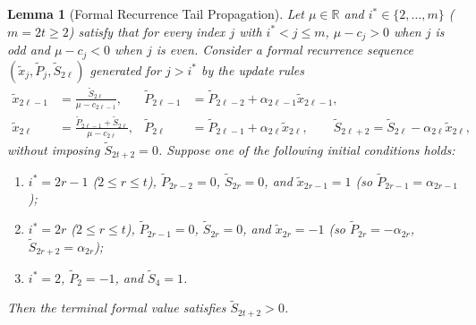 \documentclass[11pt,a4paper]{article}
\newtheorem{lemma}[theorem]{Lemma}
\theoremstyle{definition}
\begin{document}
\begin{lemma}[Formal Recurrence Tail Propagation]\label{lem:sign}
  Let $\mu \in \mathbb{R}$ and $i^* \in \{2,\dots,m\}$ ($m = 2t \ge 2$) satisfy that for every index $j$ with $i^* < j \le m$, $\mu - c_j > 0$ when $j$ is odd and $\mu - c_j < 0$ when $j$ is even. Consider a formal recurrence sequence $(\tilde{x}_j, \tilde{P}_j, \tilde{S}_{2\ell})$ generated for $j > i^*$ by the update rules
  \begin{align*}
    \tilde{x}_{2\ell-1} &= \frac{\tilde{S}_{2\ell}}{\mu - c_{2\ell-1}}, & \tilde{P}_{2\ell-1} &= \tilde{P}_{2\ell-2} + \alpha_{2\ell-1}\tilde{x}_{2\ell-1}, \\
    \tilde{x}_{2\ell} &= \frac{\tilde{P}_{2\ell-1} + \tilde{S}_{2\ell}}{\mu - c_{2\ell}}, & \tilde{P}_{2\ell} &= \tilde{P}_{2\ell-1} + \alpha_{2\ell}\tilde{x}_{2\ell}, \qquad \tilde{S}_{2\ell+2} = \tilde{S}_{2\ell} - \alpha_{2\ell}\tilde{x}_{2\ell},
  \end{align*}
  without imposing $\tilde{S}_{2t+2} = 0$. Suppose one of the following initial conditions holds:
  \begin{enumerate}
    \item[(a)] $i^* = 2r - 1$ ($2 \le r \le t$), $\tilde{P}_{2r-2} = 0$, $\tilde{S}_{2r} = 0$, and $\tilde{x}_{2r-1} = 1$ (so $\tilde{P}_{2r-1} = \alpha_{2r-1}$);
    \item[(b)] $i^* = 2r$ ($2 \le r \le t$), $\tilde{P}_{2r-1} = 0$, $\tilde{S}_{2r} = 0$, and $\tilde{x}_{2r} = -1$ (so $\tilde{P}_{2r} = -\alpha_{2r}$, $\tilde{S}_{2r+2} = \alpha_{2r}$);
    \item[(c)] $i^* = 2$, $\tilde{P}_2 = -1$, and $\tilde{S}_4 = 1$.
  \end{enumerate}
  Then the terminal formal value satisfies $\tilde{S}_{2t+2} > 0$.
\end{lemma}
\end{document}
